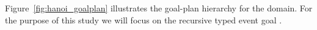 Figure~\ref{fig:hanoi_goalplan} illustrates the goal-plan hierarchy for the domain. 
For the purpose of this study we will focus on the recursive typed event goal .
%



